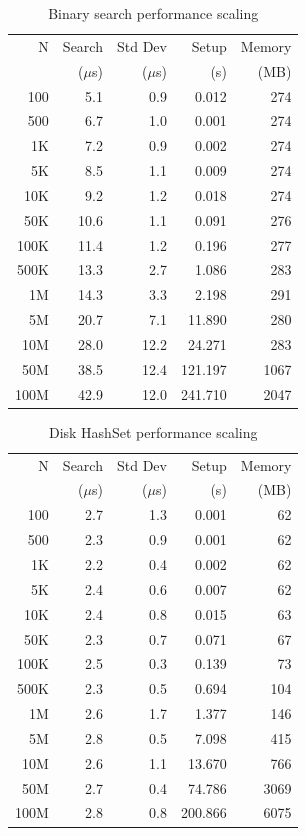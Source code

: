 \documentclass[sigconf]{acmart}
\begin{document}
\begin{table}[h]
\caption{Binary search performance scaling}
\scriptsize
\begin{tabular}{rrrrr}
\hline
N & Search & Std Dev & Setup & Memory \\
 & ($\mu$s) & ($\mu$s) & (s) & (MB) \\
\hline
100 & 5.1 & 0.9 & 0.012 & 274 \\
500 & 6.7 & 1.0 & 0.001 & 274 \\
1K & 7.2 & 0.9 & 0.002 & 274 \\
5K & 8.5 & 1.1 & 0.009 & 274 \\
10K & 9.2 & 1.2 & 0.018 & 274 \\
50K & 10.6 & 1.1 & 0.091 & 276 \\
100K & 11.4 & 1.2 & 0.196 & 277 \\
500K & 13.3 & 2.7 & 1.086 & 283 \\
1M & 14.3 & 3.3 & 2.198 & 291 \\
5M & 20.7 & 7.1 & 11.890 & 280 \\
10M & 28.0 & 12.2 & 24.271 & 283 \\
50M & 38.5 & 12.4 & 121.197 & 1067 \\
100M & 42.9 & 12.0 & 241.710 & 2047 \\
\hline
\end{tabular}
\label{tab:binary-results}
\end{table}

\begin{table}[h]
\caption{Disk HashSet performance scaling}
\scriptsize
\begin{tabular}{rrrrr}
\hline
N & Search & Std Dev & Setup & Memory \\
 & ($\mu$s) & ($\mu$s) & (s) & (MB) \\
\hline
100 & 2.7 & 1.3 & 0.001 & 62 \\
500 & 2.3 & 0.9 & 0.001 & 62 \\
1K & 2.2 & 0.4 & 0.002 & 62 \\
5K & 2.4 & 0.6 & 0.007 & 62 \\
10K & 2.4 & 0.8 & 0.015 & 63 \\
50K & 2.3 & 0.7 & 0.071 & 67 \\
100K & 2.5 & 0.3 & 0.139 & 73 \\
500K & 2.3 & 0.5 & 0.694 & 104 \\
1M & 2.6 & 1.7 & 1.377 & 146 \\
5M & 2.8 & 0.5 & 7.098 & 415 \\
10M & 2.6 & 1.1 & 13.670 & 766 \\
50M & 2.7 & 0.4 & 74.786 & 3069 \\
100M & 2.8 & 0.8 & 200.866 & 6075 \\
\hline
\end{tabular}
\label{tab:disk-results}
\end{table}
\end{document}
